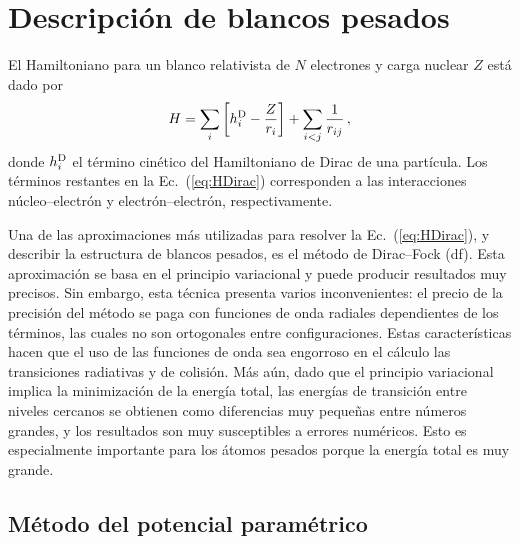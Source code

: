 \section{Descripción de blancos pesados}
\label{sec:method-target}

El Hamiltoniano para un blanco relativista de $N$ electrones y carga 
nuclear $Z$ está dado por
\begin{equation}
H = \sum_i \left[ h_i^{\mbox{\scriptsize D}} - \frac{Z}{r_i}\right]
+ \sum_{i<j}\frac{1}{r_{ij}}\,,
\label{eq:HDirac}
\end{equation}
donde $h_i^{\mbox{\scriptsize D}}$ el término cinético del 
Hamiltoniano de Dirac de una partícula. Los términos restantes en la
Ec.~(\ref{eq:HDirac}) corresponden a las interacciones 
núcleo--electrón y electrón--electrón, respectivamente. 

Una de las aproximaciones más utilizadas para resolver la 
Ec.~(\ref{eq:HDirac}), y describir la estructura de blancos pesados, es 
el método de Dirac--Fock (\acs{df}). Esta aproximación se basa en el 
principio variacional y puede producir resultados muy precisos. Sin 
embargo, esta técnica presenta varios inconvenientes: el precio de la 
precisión del método se paga con funciones de onda radiales dependientes 
de los términos, las cuales no son ortogonales entre configuraciones. 
Estas características hacen que el uso de las funciones de onda sea 
engorroso en el cálculo las transiciones radiativas y de colisión. Más 
aún, dado que el principio variacional implica la minimización de la 
energía total, las energías de transición entre niveles cercanos se 
obtienen como diferencias muy pequeñas entre números grandes, y los 
resultados son muy susceptibles a errores numéricos. Esto es 
especialmente importante para los átomos pesados porque la energía total 
es muy grande. 

\subsection{Método del potencial paramétrico}


